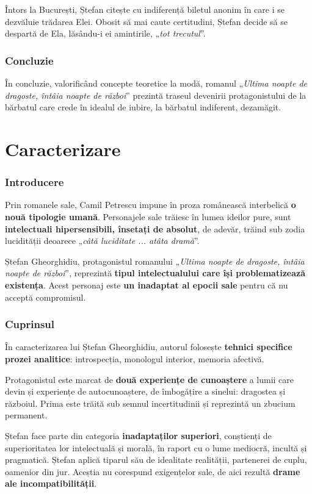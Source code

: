 \documentclass{article}
\newcommand{\qu}[1]{„\emph{#1}”}
\begin{document}
Întors la București, Ștefan citește cu indiferență biletul anonim în care i se dezvăluie trădarea Elei. Obosit să mai caute certitudini, Ștefan decide să se despartă de Ela, lăsându-i ei amintirile, \qu{tot trecutul}.
\section{Concluzie}
În concluzie, valorificând concepte teoretice la modă, romanul \qu{Ultima noapte de dragoste, întâia noapte de război} prezintă traseul devenirii protagonistului de la bărbatul care crede în idealul de iubire, la bărbatul indiferent, dezamăgit.

\part*{Caracterizare}
\setcounter{section}{0}
\section{Introducere}
Prin romanele sale, Camil Petrescu impune în proza românească interbelică \textbf{o nouă tipologie umană}. Personajele sale trăiesc în lumea ideilor pure, sunt \textbf{intelectuali hipersensibili, însetați de absolut}, de adevăr, trăind sub zodia lucidității deoarece \qu{câtă luciditate ... atâta dramă}.

Ștefan Gheorghidiu, protagonistul romanului \qu{Ultima noapte de dragoste, întâia noapte de război}, reprezintă \textbf{tipul intelectualului care își problematizează existența}. Acest personaj este \textbf{un inadaptat al epocii sale} pentru că nu acceptă compromisul.
\section{Cuprinsul}
În caracterizarea lui Ștefan Gheorghidiu, autorul folosește \textbf{tehnici specifice prozei analitice}: introspecția, monologul interior, memoria afectivă.

Protagonistul este marcat de \textbf{două experiențe de cunoaștere} a lumii care devin și experiențe de autocunoaștere, de îmbogățire a sinelui: dragostea și războiul. Prima este trăită sub semnul incertitudinii și reprezintă un zbucium permanent.

Ștefan face parte din categoria \textbf{inadaptaților superiori}, conștienți de superioritatea lor intelectuală și morală, în raport cu o lume mediocră, incultă și pragmatică. Ștefan aplică tiparul său de idealitate realității, partenerei de cuplu, oamenior din jur. Aceștia nu corespund exigențelor sale, de aici rezultă \textbf{drame ale incompatibilității}.
\end{document}

